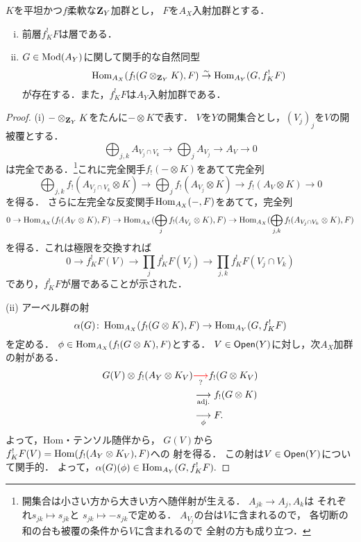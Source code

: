 \begin{LMM}
    \(K\)を平坦かつ\(f\)柔軟な\(\mathbf{Z}_Y\)加群とし，
    \(F\)を\(A_X\)入射加群とする．
    \begin{enumerate}[(i)]
        \item 前層\(f^!_KF\)は層である．
        \item \(G\in\mathop{\mathrm{Mod}}\nolimits(A_Y)\)に関して関手的な自然同型\[
            \mathop{\mathrm{Hom}}\nolimits_{A_X}(f_!(G\otimes_{\mathbf{Z}_Y}K),F)\overset{\sim}{\rightarrow}\mathop{\mathrm{Hom}}\nolimits_{A_Y}(G,f^!_KF)
        \]が存在する．また，\(f^!_KF\)は\(A_Y\)入射加群である．
    \end{enumerate}
\end{LMM}
\begin{proof}
    (i) 
    \(-\otimes_{\mathbf{Z}_Y}K\)をたんに\(-\otimes K\)で表す．
    \(V\)を\(Y\)の開集合とし，\((V_j)_j\)を\(V\)の開被覆とする．
    \[
        \bigoplus_{j,k}A_{V_{j}\cap V_{k}}\to\bigoplus_{j}A_{V_j}\to A_V\to0
    \]は完全である．\footnote{
        開集合は小さい方から大きい方へ随伴射が生える．
        \(A_{jk}\to{A_{j},A_{k}}\)は
        それぞれ\(s_{jk}\mapsto s_{jk}\)と
        \(s_{jk}\mapsto -s_{jk}\)で定める．
        \(A_{V_j}\)の台は\(V\)に含まれるので，
        各切断の和の台も被覆の条件から\(V\)に含まれるので
        全射の方も成り立つ．
    }これに完全関手\(f_!(-\otimes{K})\)をあてて完全列
    \[
        \bigoplus_{j,k}f_!(A_{V_{j}\cap V_{k}}\otimes{K})
        \to\bigoplus_{j}f_!(A_{V_j}\otimes{K})
        \to f_!(A_V\otimes{K})\to0
    \]
    を得る．
    さらに左完全な反変関手\(\mathop{\mathrm{Hom}}\nolimits_{A_X}(-,F)\)をあてて，完全列
    \[
        0
        \to 
        \mathop{\mathrm{Hom}}\nolimits_{A_X}(f_!(A_V\otimes{K}),F)\to
        \mathop{\mathrm{Hom}}\nolimits_{A_X}(\bigoplus_{j}f_!(A_{V_j}\otimes{K}),F)\to
        \mathop{\mathrm{Hom}}\nolimits_{A_X}(\bigoplus_{j,k}f_!(A_{V_{j}\cap V_{k}}\otimes{K}),F)
    \]を得る．これは極限を交換すれば
    \[
        0\to
        f_K^!F(V)\to
        \prod_{j}f_K^!F(V_j)\to
        \prod_{j,k}f_K^!F(V_j\cap V_k)
    \]であり，\(f_K^!F\)が層であることが示された．

    (ii) 
    アーベル群の射\[
        \alpha(G)\colon\mathop{\mathrm{Hom}}\nolimits_{A_X}(f_!(G\otimes{K}),F)
        \to\mathop{\mathrm{Hom}}\nolimits_{A_Y}(G,f^!_KF)
    \]を定める．
    \(\phi\in\mathop{\mathrm{Hom}}\nolimits_{A_X}(f_!(G\otimes{K}),F)\)とする．
    \(V\in\mathop{\textsf{Open}}\nolimits(Y)\)に対し，次\(A_X\)加群の射がある．
    \begin{align*}
        G(V)\otimes f_!(A_Y\otimes{K_V})
        &\underset{?}{\textcolor{red}{\longrightarrow}}
        f_!(G\otimes{K_V})\\
        &\underset{\text{adj.}}{\longrightarrow}f_!(G\otimes{K})\\
        &\underset{\phi}{\longrightarrow}F.
    \end{align*}
    よって，Hom・テンソル随伴から，
    \(G(V)\)から\(f^!_KF(V)=\mathop{\mathrm{Hom}}\nolimits(f_!(A_Y\otimes{K_V}),F)\)への
    射を得る．
    この射は\(V\in\mathop{\textsf{Open}}\nolimits(Y)\)について関手的．
    よって，\(\alpha(G)(\phi)\in\mathop{\mathrm{Hom}}\nolimits_{A_Y}(G,f^!_KF).\)


\end{proof}
